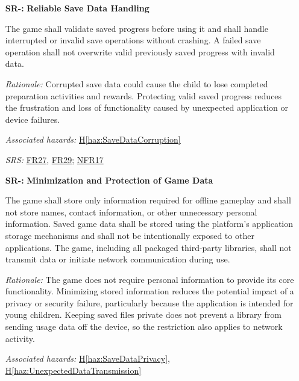 \documentclass{article}
\newcounter{hazard}
\newcommand{\hazref}[1]{\hyperref[haz:#1]{H\ref*{haz:#1}}}
\newcounter{sr}
\newcommand{\srdef}[1]{\refstepcounter{sr}\label{sr:#1}\textbf{SR-\thesr:}}
\newcommand{\srsurl}{https://team-hindsight.github.io/ophthamology-game/SRS/SRS.pdf}
\newcommand{\srsfrref}[2]{\href{\srsurl\#nameddest=#1}{FR#2}}
\newcommand{\srsnfrref}[2]{\href{\srsurl\#nameddest=#1}{NFR#2}}
\begin{document}
\begin{itemize}[leftmargin=1.5cm, labelwidth=1.3cm, labelsep=0.2cm,
  align=left, itemsep=1.2em, parsep=0.6em]
\textit{Rationale:}
Removes the cause where the child turns cues off intentionally or accidentally, 
while still allowing a parent to adjust for accessibility needs.

\textit{Associated hazards:}
\hazref{VisualCuesDisabledSetting}

\textit{SRS:} \srsfrref{FR_VisualCues}{14}, \srsfrref{FR_ParentGate}{40}, \srsfrref{FR_Preferences}{43}; \srsnfrref{NFR_Accessibility}{9}

\item[\srdef{ReliableSaveData}]
\textbf{Reliable Save Data Handling}

The game shall validate saved progress before
using it and shall handle interrupted or invalid
save operations without crashing. A failed save
operation shall not overwrite valid previously
saved progress with invalid data.

\textit{Rationale:}
Corrupted save data could cause the child to
lose completed preparation activities and rewards.
Protecting valid saved progress reduces the
frustration and loss of functionality caused by
unexpected application or device failures.

\textit{Associated hazards:}
\hazref{SaveDataCorruption}

\textit{SRS:} \srsfrref{FR_PersistState}{27}, \srsfrref{FR_CorruptData}{29}; \srsnfrref{NFR_Reliability}{17}

\item[\srdef{MinimalSaveData}]
\textbf{Minimization and Protection of Game Data}

The game shall store only information required
for offline gameplay and shall not store names,
contact information, or other unnecessary
personal information. Saved game data shall be
stored using the platform's application storage
mechanisms and shall not be intentionally exposed
to other applications.
The game, including all packaged third-party libraries,
shall not transmit data or initiate network communication
during use.

\textit{Rationale:}
The game does not require personal information
to provide its core functionality. Minimizing
stored information reduces the potential impact
of a privacy or security failure, particularly
because the application is intended for young
children.
Keeping saved files private does not prevent a library
from sending usage data off the device, so the restriction
also applies to network activity.

\textit{Associated hazards:}
\hazref{SaveDataPrivacy}, \hazref{UnexpectedDataTransmission}


\end{itemize}
\end{document}
